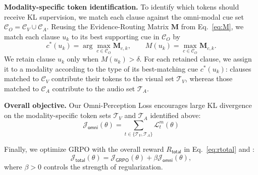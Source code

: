 \documentclass{article}
\theoremstyle{plain}
\theoremstyle{definition}
\theoremstyle{remark}
\begin{document}
\noindent\textbf{Modality-specific token identification.}
To identify which tokens should receive KL supervision, we match each clause against the omni-modal cue set $\mathcal{C}_O = \mathcal{C}_V \cup \mathcal{C}_A$.
Reusing the Evidence-Routing Matrix $\mathbf{M}$ from Eq.~\eqref{eq:M}, we match each clause $u_k$ to its best supporting cue in $\mathcal{C}_O$ by
\begin{equation}
\label{eq:clause_match}
c^*(u_k)=\arg\max_{c\in\mathcal{C}_O}\mathbf{M}_{c,k}, 
\qquad
{M}(u_k)=\max_{c\in\mathcal{C}_O}\mathbf{M}_{c,k}.
\end{equation}
We retain clause $u_k$ only when ${M}(u_k)>\delta$. For each retained clause, we assign it to a modality according to the type of its best-matching cue $c^*(u_k)$: clauses matched to $\mathcal{C}_V$ contribute their tokens to the visual set $\mathcal{T}_V$, whereas those matched to $\mathcal{C}_A$ contribute to the audio set $\mathcal{T}_A$.







\noindent\textbf{Overall objective.}
Our Omni-Perception Loss encourages large KL divergence on the modality-specific token sets $\mathcal{T}_V$ and $\mathcal{T}_A$ identified above:
\begin{equation}
    \mathcal{J}_\mathsf{omni}(\theta)=\sum_{t\in \{\mathcal{T}_V,\mathcal{T}_A\}}\mathcal{L}_t^{m}(\theta)
\end{equation}


Finally, we optimize GRPO with the overall reward $R_\mathsf{total}$ in Eq.~\eqref{eq:rtotal} and \ourloss:
\begin{equation}
\label{eq:loss_total}
\mathcal{J}_\mathsf{total}(\theta)
=\mathcal{J}_{\mathsf{GRPO}}(\theta)+\beta \mathcal{J}_\mathsf{omni}(\theta) ,
\end{equation}
where $\beta>0$ controls the strength of regularization.
\end{document}

